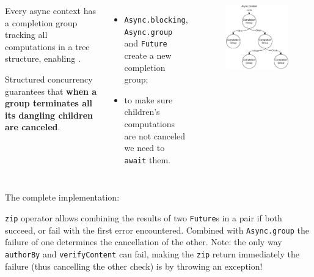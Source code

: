 \documentclass[aspectratio=1610,xcolor=dvipsnames,handout]{beamer}
\begin{document}
\begin{frame}
  \begin{columns}
      \begin{block}{}
        Every async context has a completion group tracking all computations in a tree structure, enabling . 

        Structured concurrency guarantees that \textbf{when a group terminates all its dangling children are canceled}.
      \end{block}
      \begin{itemize}
        \item \texttt{Async.blocking}, \texttt{Async.group} and \texttt{Future} create a new completion group;
        \item to make sure children's computations are not canceled we need to \texttt{await} them.
      \end{itemize}
      \begin{figure}
        \centering
        \includegraphics[width=\textwidth]{./images/structured-concurrency.pdf}
      \end{figure}
  \end{columns}
\end{frame}
%
\begin{frame}
  \small
  The complete implementation:
  
  \texttt{zip} operator allows combining the results of two \texttt{Future}s in a pair if both succeed, or fail with the first error encountered. Combined with \texttt{Async.group} the failure of one determines the cancellation of the other.
  Note: the only way \texttt{authorBy} and \texttt{verifyContent} can fail, making the \texttt{zip} return immediately the failure (thus cancelling the other check) is by throwing an exception!
\end{frame}
\end{document}
